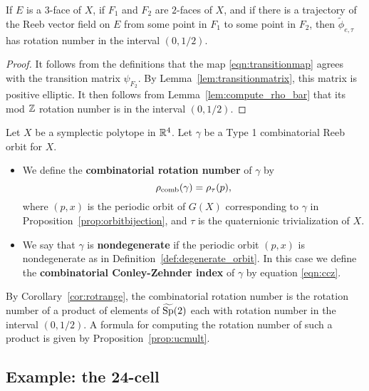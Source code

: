 \begin{corollary}
\label{cor:rotrange}
If $E$ is a $3$-face of $X$, if $F_1$ and $F_2$ are $2$-faces of $X$, and if there is a trajectory of the Reeb vector field on $E$ from some point in $F_1$ to some point in $F_2$, then $\widetilde{\phi}_{e,\tau}$ has rotation number in the interval $(0,1/2)$.
\end{corollary}

\begin{proof}
It follows from the definitions that the map \eqref{eqn:transitionmap} agrees with the transition matrix $\psi_{F_2}$. By Lemma~\ref{lem:transitionmatrix}, this matrix is positive elliptic. It then follows from Lemma~\ref{lem:compute_rho_bar} that its mod ${\mathbb Z}$ rotation number is in the interval $(0,1/2)$.
\end{proof}

\begin{definition}
\label{def:crn}
Let $X$ be a symplectic polytope in ${\mathbb R}^4$. Let $\gamma$ be a Type 1 combinatorial Reeb orbit for $X$.
\begin{itemize}
\item
We define the {\bf combinatorial rotation number\/} of $\gamma$ by
\[
\rho_{\operatorname{comb}}(\gamma) = \rho_\tau(p),
\]
where $(p,x)$ is the periodic orbit of $G(X)$ corresponding to $\gamma$ in Proposition~\ref{prop:orbitbijection}, and $\tau$ is the quaternionic trivialization of $X$.
\item We say that $\gamma$ is {\bf nondegenerate\/} if the periodic orbit $(p,x)$ is nondegenerate as in Definition~\ref{def:degenerate_orbit}. In this case we define the {\bf combinatorial Conley-Zehnder index\/} of $\gamma$ by equation \eqref{eqn:ccz}.
\end{itemize}
\end{definition}

\begin{remark}
\label{rem:ucmult}
By Corollary~\ref{cor:rotrange}, the combinatorial rotation number is the rotation number of a product of elements of $\widetilde{\operatorname{Sp}}(2)$ each with rotation number in the interval $(0,1/2)$. A formula for computing the rotation number of such a product is given by Proposition~\ref{prop:ucmult}. 
\end{remark}

\subsection{Example: the 24-cell}
\label{sec:24_cell}

